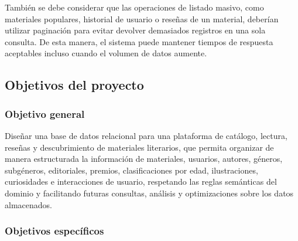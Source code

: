 \documentclass[12pt,a4paper]{article}
\begin{document}
También se debe considerar que las operaciones de listado masivo, como materiales populares, historial de usuario o reseñas de un material, deberían utilizar paginación para evitar devolver demasiados registros en una sola consulta. De esta manera, el sistema puede mantener tiempos de respuesta aceptables incluso cuando el volumen de datos aumente.
\subsection{Objetivos del proyecto}

\subsubsection{Objetivo general}

Diseñar una base de datos relacional para una plataforma de catálogo, lectura, reseñas y descubrimiento de materiales literarios, que permita organizar de manera estructurada la información de materiales, usuarios, autores, géneros, subgéneros, editoriales, premios, clasificaciones por edad, ilustraciones, curiosidades e interacciones de usuario, respetando las reglas semánticas del dominio y facilitando futuras consultas, análisis y optimizaciones sobre los datos almacenados.

\subsubsection{Objetivos específicos}
\end{document}
